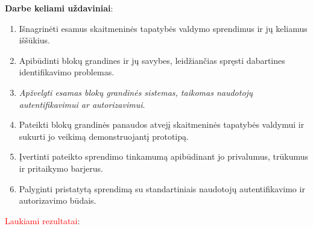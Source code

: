 \textbf{Darbe keliami uždaviniai}:

\begin{enumerate}
    \item Išnagrinėti esamus skaitmeninės tapatybės valdymo sprendimus ir jų keliamus iššūkius.
    \item Apibūdinti blokų grandines ir jų savybes, leidžiančias spręsti dabartines identifikavimo problemas.
    \item \textit{Apžvelgti esamas blokų grandinės sistemas, taikomas naudotojų autentifikavimui ar autorizavimui}.
    \item Pateikti blokų grandinės panaudos atvejį skaitmeninės tapatybės valdymui ir sukurti jo veikimą demonstruojantį prototipą.
    \item Įvertinti pateikto sprendimo tinkamumą apibūdinant jo privalumus, trūkumus ir pritaikymo barjerus.
    \item Palyginti pristatytą sprendimą su standartiniais naudotojų autentifikavimo ir autorizavimo būdais.
\end{enumerate}

\textcolor{red}{Laukiami rezultatai}:
